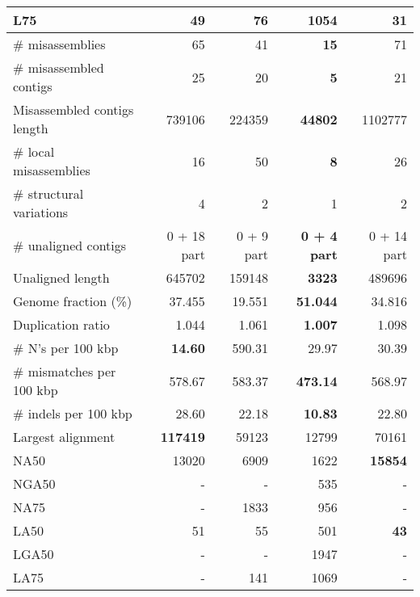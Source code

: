 \documentclass[12pt,a4paper]{article}
\begin{document}
\begin{table}[ht]
\begin{center}
\begin{tabular}{|l*{4}{|r}|}
L75 & 49 & 76 & 1054 & {\bf 31} \\ \hline
\# misassemblies & 65 & 41 & {\bf 15} & 71 \\ \hline
\# misassembled contigs & 25 & 20 & {\bf 5} & 21 \\ \hline
Misassembled contigs length & 739106 & 224359 & {\bf 44802} & 1102777 \\ \hline
\# local misassemblies & 16 & 50 & {\bf 8} & 26 \\ \hline
\# structural variations & 4 & 2 & 1 & 2 \\ \hline
\# unaligned contigs & 0 + 18 part & 0 + 9 part & {\bf 0 + 4 part} & 0 + 14 part \\ \hline
Unaligned length & 645702 & 159148 & {\bf 3323} & 489696 \\ \hline
Genome fraction (\%) & 37.455 & 19.551 & {\bf 51.044} & 34.816 \\ \hline
Duplication ratio & 1.044 & 1.061 & {\bf 1.007} & 1.098 \\ \hline
\# N's per 100 kbp & {\bf 14.60} & 590.31 & 29.97 & 30.39 \\ \hline
\# mismatches per 100 kbp & 578.67 & 583.37 & {\bf 473.14} & 568.97 \\ \hline
\# indels per 100 kbp & 28.60 & 22.18 & {\bf 10.83} & 22.80 \\ \hline
Largest alignment & {\bf 117419} & 59123 & 12799 & 70161 \\ \hline
NA50 & 13020 & 6909 & 1622 & {\bf 15854} \\ \hline
NGA50 & - & - & 535 & - \\ \hline
NA75 & - & 1833 & 956 & - \\ \hline
LA50 & 51 & 55 & 501 & {\bf 43} \\ \hline
LGA50 & - & - & 1947 & - \\ \hline
LA75 & - & 141 & 1069 & - \\ \hline
\end{tabular}
\end{center}
\end{table}
\end{document}
